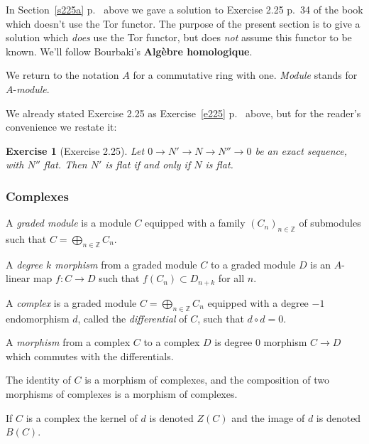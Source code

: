 \documentclass[parskip=half,fontsize=12pt]{scrartcl}%
\newtheorem{exo}[thm]{Exercise}
\begin{document}
In Section~\ref{s225a} p.~\pageref{s225a} above we gave a solution to Exercise 2.25 p.~34 of the book which doesn't use the Tor functor. The purpose of the present section is to give a solution which \emph{does} use the Tor functor, but does \emph{not} assume this functor to be known. We'll follow Bourbaki's \textbf{Algèbre homologique}.

We return to the notation $A$ for a commutative ring with one. \emph{Module} stands for $A$-\emph{module}. 

We already stated Exercise 2.25 as Exercise~\ref{e225} p.~\pageref{e225} above, but for the reader's convenience we restate it:

\begin{exo}[Exercise 2.25]\label{e225b}
Let $0\to N'\to N\to N''\to0$ be an exact sequence, with $N''$ flat. Then $N'$ is flat if and only if $N$ is flat.
\end{exo}



\subsubsection{Complexes}%

A \emph{graded module} is a module $C$ equipped with a family $(C_n)_{n\in\mathbb Z}$ of submodules such that $C=\bigoplus_{n\in\mathbb Z}C_n$. 

A \emph{degree $k$ morphism} from a graded module $C$ to a graded module $D$ is an $A$-linear map $f:C\to D$ such that $f(C_n)\subset D_{n+k}$ for all $n$. 

A \emph{complex} is a graded module $C=\bigoplus_{n\in\mathbb Z}C_n$ equipped with a degree $-1$ endomorphism $d$, called the \emph{differential} of $C$, such that $d\circ d=0$. 

A \emph{morphism} from a complex $C$ to a complex $D$ is degree $0$ morphism $C\to D$ which commutes with the differentials. 

The identity of $C$ is a morphism of complexes, and the composition of two morphisms of complexes is a morphism of complexes. 

If $C$ is a complex the kernel of $d$ is denoted $Z(C)$ and the image of $d$ is denoted $B(C)$. 
\end{document}
